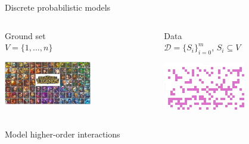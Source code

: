 \documentclass[mathserif]{beamer}
\begin{document}
\begin{frame}{Discrete probabilistic models}
\begin{columns}[t]
\begin{column}{0.5\textwidth}
\centering
Ground set\\[0.5em]
$V = \{1,\ldots,n\}$

\vspace{1.3em}
\includegraphics[width=1.5in]{figures/champions_transparent.png}
\end{column}
\begin{column}{0.5\textwidth}
\centering
Data\\[0.5em]
$\mathcal D = \{S_i\}_{i=0}^m$, $S_i \subseteq V$

\vspace{0.9em}
\includegraphics[width=1.4in]{figures/grid_hots.pdf}
\end{column}
\end{columns}

\vspace{1.5em}

\begin{center}
Model {\color{col1}higher-order} interactions\\[0.5em]


\end{center}
\end{frame}
\end{document}
